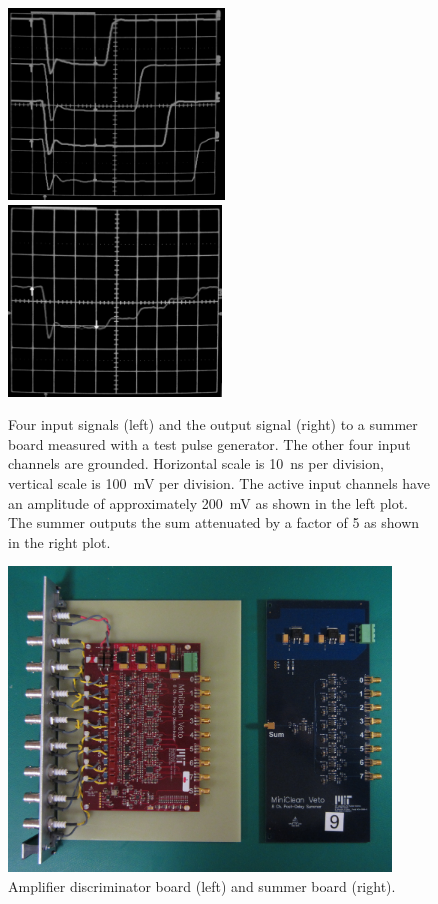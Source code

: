 \documentclass[review,number,sort&compress]{elsarticle}
\begin{document}
\begin{figure}[ht]
	\begin{center}
		\includegraphics[height=2in, keepaspectratio=true]{graphics/sumpulseinput_bw.png}
		\includegraphics[height=2in, keepaspectratio=true]{graphics/sumpulseoutput_bw.png}
		\caption{Four input signals (left) and the output signal (right) to a summer board measured with a test pulse generator. The other four input channels are grounded. Horizontal scale is 10~ns per division, vertical scale is 100~mV per division.  The active input channels have an amplitude of approximately 200~mV as shown in the left plot.  The summer outputs the sum attenuated by a factor of 5 as shown in the right plot.
		\label{fig:summerpulse}}
	\end{center}
\end{figure}

\begin{figure}[ht]
\begin{center}
\includegraphics[width=4in, keepaspectratio=true]{graphics/boards.JPG}
\caption{Amplifier discriminator board (left) and summer board (right).
\label{fig:boards}}
\end{center}
\end{figure}
\end{document}
